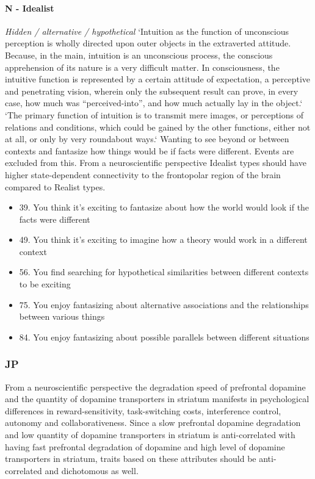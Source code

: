 \documentclass[11pt,a4paper]{article}
\begin{document}
\paragraph{N - Idealist}
\emph{Hidden / alternative / hypothetical}
`Intuition as the function of unconscious perception is wholly directed upon outer objects in the extraverted attitude. Because, in the main, intuition is an unconscious process, the conscious apprehension of its nature is a very difficult matter. In consciousness, the intuitive function is represented by a certain attitude of expectation, a perceptive and penetrating vision, wherein only the subsequent result can prove, in every case, how much was\cite[p. 462]{jung1} ``perceived-into'', and how much actually lay in the object.`\cite[p. 461-462]{jung1}
`The primary function of intuition is to transmit mere images, or perceptions of relations and conditions, which could be gained by the other functions, either not at all, or only by very roundabout ways.`\cite[p. 462]{jung1}
Wanting to see beyond or between contexts and fantasize how things would be if facts were different. Events are excluded from this.
From a neuroscientific perspective Idealist types should have higher state-dependent connectivity to the frontopolar region of the brain compared to Realist types.
\begin{itemize}
\item 39. You think it's exciting to fantasize about how the world would look if the facts were different
\item 49. You think it's exciting to imagine how a theory would work in a different context
\item 56. You find searching for hypothetical similarities between different contexts to be exciting
\item 75. You enjoy fantasizing about alternative associations and the relationships between various things
\item 84. You enjoy fantasizing about possible parallels between different situations
\end{itemize}

\subsubsection{JP}
From a neuroscientific perspective the degradation speed of prefrontal dopamine and the quantity of dopamine transporters in striatum manifests in psychological differences in reward-sensitivity, task-switching costs, interference control, autonomy and collaborativeness. \cite{jp1,jp2,jp3,jp4,jp5,jp6}
Since a slow prefrontal dopamine degradation and low quantity of dopamine transporters in striatum is anti-correlated with having fast prefrontal degradation of dopamine and high level of dopamine transporters in striatum, traits based on these attributes should be anti-correlated and dichotomous as well.
\end{document}
